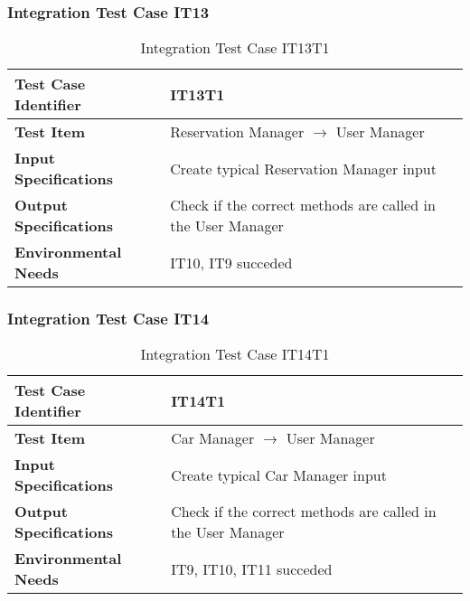 \subsubsection{Integration Test Case IT13} \label{sssec:IT13}
\vspace{16pt}
\begin{table}[htbp]
\begin{center}
\renewcommand{\arraystretch}{1.5}
\begin{tabular}{l|p{}}
\hline
\textbf{Test Case Identifier} & IT13T1\\
\hline
\textbf{Test Item} & Reservation Manager $\rightarrow$ User Manager\\
\hline
\textbf{Input Specifications} & Create typical Reservation Manager input \\
\hline
\textbf{Output Specifications} & Check if the correct methods are called in the User Manager \\
\hline
\textbf{Environmental Needs} & IT10, IT9 succeded\\
\hline
\end{tabular}
\caption{Integration Test Case IT13T1}
\end{center}
\end{table}

\vspace{10pt}
\subsubsection{Integration Test Case IT14} \label{sssec:IT14}
\vspace{16pt}
\begin{table}[htbp]
\begin{center}
\renewcommand{\arraystretch}{1.5}
\begin{tabular}{l|p{}}
\hline
\textbf{Test Case Identifier} & IT14T1\\
\hline
\textbf{Test Item} & Car Manager $\rightarrow$ User Manager\\
\hline
\textbf{Input Specifications} & Create typical Car Manager input \\
\hline
\textbf{Output Specifications} & Check if the correct methods are called in the User Manager \\
\hline
\textbf{Environmental Needs} & IT9, IT10, IT11 succeded\\
\hline
\end{tabular}
\caption{Integration Test Case IT14T1}
\end{center}
\end{table}
\clearpage

